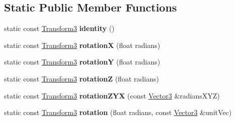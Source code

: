 \subsection*{Static Public Member Functions}
\begin{DoxyCompactItemize}
\item 
\hypertarget{class_vectormath_1_1_aos_1_1_transform3_ade2ab6bc76576386a76e14264f75fdf5}{static const \hyperlink{class_vectormath_1_1_aos_1_1_transform3}{Transform3} {\bfseries identity} ()}\label{class_vectormath_1_1_aos_1_1_transform3_ade2ab6bc76576386a76e14264f75fdf5}

\item 
\hypertarget{class_vectormath_1_1_aos_1_1_transform3_a704c79773d3152c81f89c4559baf9c04}{static const \hyperlink{class_vectormath_1_1_aos_1_1_transform3}{Transform3} {\bfseries rotation\+X} (float radians)}\label{class_vectormath_1_1_aos_1_1_transform3_a704c79773d3152c81f89c4559baf9c04}

\item 
\hypertarget{class_vectormath_1_1_aos_1_1_transform3_a94b0d26cde5a0c51cee484de6908e126}{static const \hyperlink{class_vectormath_1_1_aos_1_1_transform3}{Transform3} {\bfseries rotation\+Y} (float radians)}\label{class_vectormath_1_1_aos_1_1_transform3_a94b0d26cde5a0c51cee484de6908e126}

\item 
\hypertarget{class_vectormath_1_1_aos_1_1_transform3_ac937cd488a09d971d401ba69a73bcfaa}{static const \hyperlink{class_vectormath_1_1_aos_1_1_transform3}{Transform3} {\bfseries rotation\+Z} (float radians)}\label{class_vectormath_1_1_aos_1_1_transform3_ac937cd488a09d971d401ba69a73bcfaa}

\item 
\hypertarget{class_vectormath_1_1_aos_1_1_transform3_a6ffd290b9f03f13493e1d026bdb2d441}{static const \hyperlink{class_vectormath_1_1_aos_1_1_transform3}{Transform3} {\bfseries rotation\+Z\+Y\+X} (const \hyperlink{class_vectormath_1_1_aos_1_1_vector3}{Vector3} \&radians\+X\+Y\+Z)}\label{class_vectormath_1_1_aos_1_1_transform3_a6ffd290b9f03f13493e1d026bdb2d441}

\item 
\hypertarget{class_vectormath_1_1_aos_1_1_transform3_a67eea08ba0db05580bb2504aa52b40df}{static const \hyperlink{class_vectormath_1_1_aos_1_1_transform3}{Transform3} {\bfseries rotation} (float radians, const \hyperlink{class_vectormath_1_1_aos_1_1_vector3}{Vector3} \&unit\+Vec)}\label{class_vectormath_1_1_aos_1_1_transform3_a67eea08ba0db05580bb2504aa52b40df}


\end{DoxyCompactItemize}
